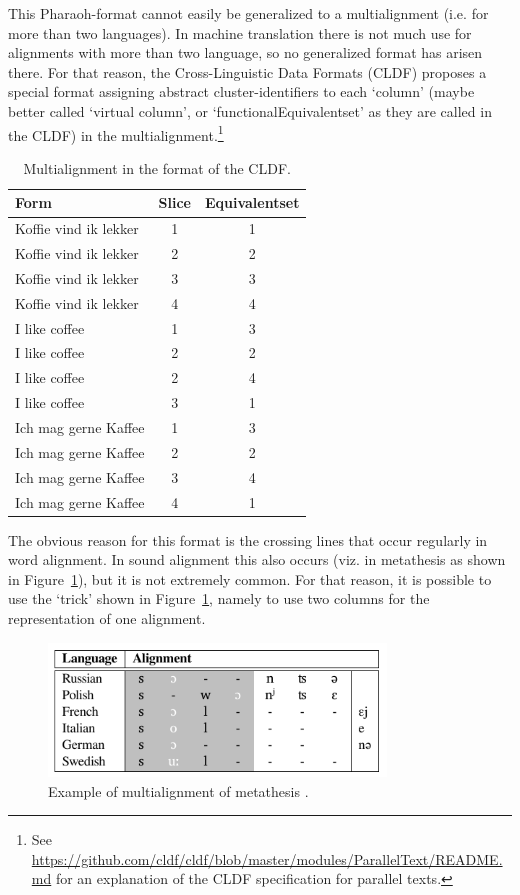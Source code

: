 \documentclass[11pt]{article}
\begin{document}
This Pharaoh-format cannot easily be generalized to a multialignment (i.e. for more than two languages). In machine translation there is not much use for alignments with more than two language, so no generalized format has arisen there. For that reason, the Cross-Linguistic Data Formats (CLDF) proposes a special format assigning  abstract cluster-identifiers to each `column' (maybe better called `virtual column', or `functionalEquivalentset' as they are called in the CLDF) in the multialignment.\footnote{See \url{https://github.com/cldf/cldf/blob/master/modules/ParallelText/README.md} for an explanation of the CLDF specification for parallel texts.}

\begin{table}[htp]
\centering
\begin{tabular}{ l c c }            \hline
 Form & Slice & Equivalentset    \\ \hline
 Koffie vind ik lekker & 1 & 1   \\
 Koffie vind ik lekker & 2 & 2   \\
 Koffie vind ik lekker & 3 & 3   \\
 Koffie vind ik lekker & 4 & 4   \\ \hline
 I like coffee         & 1 & 3   \\
 I like coffee         & 2 & 2   \\
 I like coffee         & 2 & 4   \\
 I like coffee         & 3 & 1   \\ \hline
 Ich mag gerne Kaffee  & 1 & 3   \\
 Ich mag gerne Kaffee  & 2 & 2   \\
 Ich mag gerne Kaffee  & 3 & 4   \\
 Ich mag gerne Kaffee  & 4 & 1   \\ \hline
\end{tabular}
\caption{Multialignment in the format of the CLDF.}
\label{tab:cldf_paralleltext}
\end{table}

The obvious reason for this format is the crossing lines that occur regularly in word alignment. In sound alignment this also occurs (viz. in metathesis as shown in Figure~\ref{fig:metathesis_list}), but it is not extremely common. For that reason, it is possible to use the `trick' shown in Figure~\ref{fig:metathesis_list}, namely to use two columns for the representation of one alignment.

\begin{figure}[htbp]
  \centering
  \includegraphics[width=0.8\textwidth]{images/metathesis_list.pdf}
  \caption{Example of multialignment of metathesis \parencite[135]{list2014}.}
  \label{fig:metathesis_list}
\end{figure}
\end{document}
